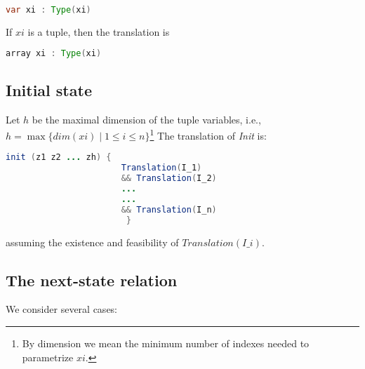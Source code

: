 \documentclass{article}
\theoremstyle{plain}
\numberwithin{equation}{section}
\renewcommand{\leq}{\leqslant}
\begin{document}
\begin{lstlisting}[language=Java]
var xi : Type(xi) 
\end{lstlisting}

If $xi$ is a tuple, then the translation is 

\begin{lstlisting}[language=Java]
array xi : Type(xi) 
\end{lstlisting}

\subsection*{Initial state} 
Let $h$ be the maximal dimension of the tuple variables, i.e., $h=\max\{dim(xi)\mid 1\leq i \leq n\}$\footnote{By dimension we mean the minimum number of indexes needed to parametrize $xi$.} 
The translation of \emph{Init} is:

\begin{lstlisting}[language=Java]
init (z1 z2 ... zh) {
                       Translation(I_1) 
                       && Translation(I_2)
                       ...
                       ...
                       && Translation(I_n)
                        }
\end{lstlisting}
assuming the existence and feasibility of \emph{$Translation(I\_i)$}.



\subsection*{The next-state relation} 
We consider several cases:
\end{document}
